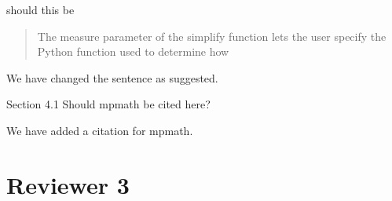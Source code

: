 \documentclass[answers,12pt]{exam}
\begin{document}
\begin{questions}
should this be
\begin{quote}
The measure parameter of the simplify function lets the user specify the Python function used to determine how
\end{quote}
\begin{solution}
We have changed the sentence as suggested.
\end{solution}
\question Section 4.1
Should mpmath be cited here?

\begin{solution}
We have added a citation for mpmath.
\end{solution}
\end{questions}

\section{Reviewer 3}
\end{document}
